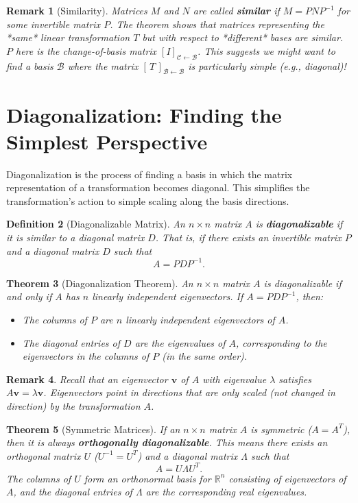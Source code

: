 \documentclass[11pt, a4paper]{article}
\theoremstyle{mytheoremstyle}
\newtheorem{theorem}{Theorem}[section]
\theoremstyle{mydefstyle}
\newtheorem{definition}[theorem]{Definition}
\newtheorem{remark}[theorem]{Remark}
\newcommand{\R}{\mathbb{R}}      %
\newcommand{\B}{\mathcal{B}}    %
\newcommand{\vb}{\mathbf{v}}     %
\newcommand{\matrixrep}[3]{[\,#1\,]_{\mathcal{#2} \leftarrow \mathcal{#3}}} %
\newcommand{\changebasis}[2]{[I]_{\mathcal{#1} \leftarrow \mathcal{#2}}} %
\begin{document}
\begin{remark}[Similarity]
Matrices $M$ and $N$ are called \textbf{similar} if $M = P N P^{-1}$ for some invertible matrix $P$. The theorem shows that matrices representing the *same* linear transformation $T$ but with respect to *different* bases are similar. $P$ here is the change-of-basis matrix $\changebasis{C}{B}$. This suggests we might want to find a basis $\B$ where the matrix $\matrixrep{T}{B}{B}$ is particularly simple (e.g., diagonal)!
\end{remark}

\section{Diagonalization: Finding the Simplest Perspective}

Diagonalization is the process of finding a basis in which the matrix representation of a transformation becomes diagonal. This simplifies the transformation's action to simple scaling along the basis directions.

\begin{definition}[Diagonalizable Matrix]
An $n \times n$ matrix $A$ is \textbf{diagonalizable} if it is similar to a diagonal matrix $D$. That is, if there exists an invertible matrix $P$ and a diagonal matrix $D$ such that
\[ A = P D P^{-1}. \]
\end{definition}

\begin{theorem}[Diagonalization Theorem]
An $n \times n$ matrix $A$ is diagonalizable if and only if $A$ has $n$ linearly independent eigenvectors.
If $A = P D P^{-1}$, then:
\begin{itemize}
    \item The columns of $P$ are $n$ linearly independent eigenvectors of $A$.
    \item The diagonal entries of $D$ are the eigenvalues of $A$, corresponding to the eigenvectors in the columns of $P$ (in the same order).
\end{itemize}
\end{theorem}

\begin{remark}
Recall that an eigenvector $\vb$ of $A$ with eigenvalue $\lambda$ satisfies $A\vb = \lambda\vb$. Eigenvectors point in directions that are only scaled (not changed in direction) by the transformation $A$.
\end{remark}

\begin{theorem}[Symmetric Matrices]
If an $n \times n$ matrix $A$ is symmetric ($A = A^T$), then it is always \textbf{orthogonally diagonalizable}. This means there exists an orthogonal matrix $U$ ($U^{-1} = U^T$) and a diagonal matrix $\Lambda$ such that
\[ A = U \Lambda U^T. \]
The columns of $U$ form an orthonormal basis for $\R^n$ consisting of eigenvectors of $A$, and the diagonal entries of $\Lambda$ are the corresponding real eigenvalues.
\end{theorem}
\end{document}
